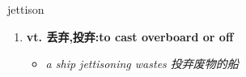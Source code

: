 
\begin{frame}
{\huge jettison}
\begin{center}
\begin{enumerate}\Large
  \item \textbf{vt. 丢弃,投弃:to cast overboard or off}
  \begin{itemize}
    \item \em{\Large{a ship jettisoning wastes 投弃废物的船}}
  \end{itemize}
\end{enumerate}
\end{center}
\end{frame}
